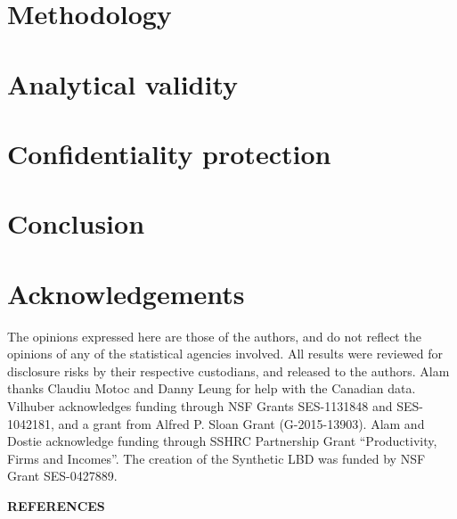 \documentclass[10pt,twoside]{article}
\begin{document}
\section{Methodology}
\label{sec:methodology}


\section{Analytical validity}
\label{sec:analytic}


\section{Confidentiality protection}
\label{sec:confidentiality}


\section{Conclusion}
\label{sec:conclusion}




\newpage


\printbibliography

\newpage



\section*{Acknowledgements}

The opinions expressed here are those of the authors, and do not reflect the opinions of any of the statistical agencies involved. All results were reviewed for disclosure risks by their respective custodians, and released to the authors. Alam thanks Claudiu Motoc and Danny Leung for help with the Canadian data. Vilhuber acknowledges funding through NSF Grants SES-1131848 and SES-1042181, and a grant from Alfred P. Sloan Grant (G-2015-13903). Alam and Dostie acknowledge funding through SSHRC Partnership Grant ``Productivity, Firms and Incomes''. The creation of the Synthetic LBD  was funded by NSF Grant SES-0427889.

\noindent \begin{center}\begin{large}{\bf REFERENCES}\end{large}\end{center}


\end{document}
